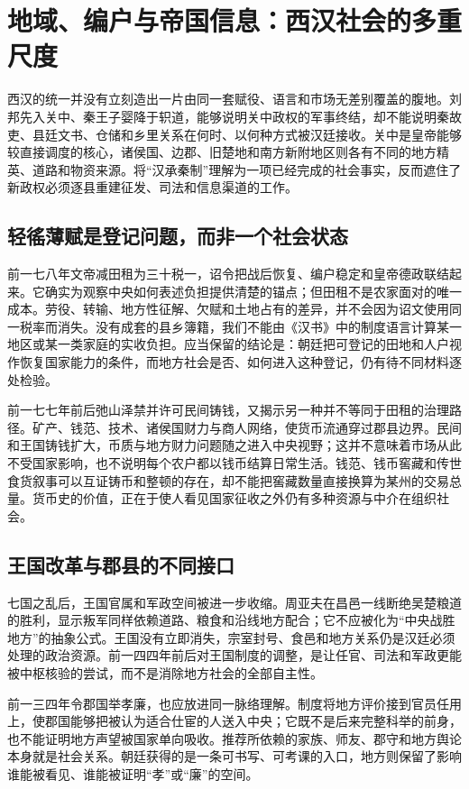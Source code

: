 \section{地域、编户与帝国信息：西汉社会的多重尺度}
\label{sec:western-han-regions-households-information}

西汉的统一并没有立刻造出一片由同一套赋役、语言和市场无差别覆盖的腹地。刘邦先入关中、秦王子婴降于轵道，能够说明关中政权的军事终结，却不能说明秦故吏、县廷文书、仓储和乡里关系在何时、以何种方式被汉廷接收。关中是皇帝能够较直接调度的核心，诸侯国、边郡、旧楚地和南方新附地区则各有不同的地方精英、道路和物资来源。将“汉承秦制”理解为一项已经完成的社会事实，反而遮住了新政权必须逐县重建征发、司法和信息渠道的工作。

\subsection{轻徭薄赋是登记问题，而非一个社会状态}

前一七八年文帝减田租为三十税一，诏令把战后恢复、编户稳定和皇帝德政联结起来。它确实为观察中央如何表述负担提供清楚的锚点；但田租不是农家面对的唯一成本。劳役、转输、地方性征解、欠赋和土地占有的差异，并不会因为诏文使用同一税率而消失。没有成套的县乡簿籍，我们不能由《汉书》中的制度语言计算某一地区或某一类家庭的实收负担。应当保留的结论是：朝廷把可登记的田地和人户视作恢复国家能力的条件，而地方社会是否、如何进入这种登记，仍有待不同材料逐处检验。

前一七七年前后弛山泽禁并许可民间铸钱，又揭示另一种并不等同于田租的治理路径。矿产、钱范、技术、诸侯国财力与商人网络，使货币流通穿过郡县边界。民间和王国铸钱扩大，币质与地方财力问题随之进入中央视野；这并不意味着市场从此不受国家影响，也不说明每个农户都以钱币结算日常生活。钱范、钱币窖藏和传世食货叙事可以互证铸币和整顿的存在，却不能把窖藏数量直接换算为某州的交易总量。货币史的价值，正在于使人看见国家征收之外仍有多种资源与中介在组织社会。

\subsection{王国改革与郡县的不同接口}

七国之乱后，王国官属和军政空间被进一步收缩。周亚夫在昌邑一线断绝吴楚粮道的胜利，显示叛军同样依赖道路、粮食和沿线地方配合；它不应被化为“中央战胜地方”的抽象公式。王国没有立即消失，宗室封号、食邑和地方关系仍是汉廷必须处理的政治资源。前一四四年前后对王国制度的调整，是让任官、司法和军政更能被中枢核验的尝试，而不是消除地方社会的全部自主性。

前一三四年令郡国举孝廉，也应放进同一脉络理解。制度将地方评价接到官员任用上，使郡国能够把被认为适合仕宦的人送入中央；它既不是后来完整科举的前身，也不能证明地方声望被国家单向吸收。推荐所依赖的家族、师友、郡守和地方舆论本身就是社会关系。朝廷获得的是一条可书写、可考课的入口，地方则保留了影响谁能被看见、谁能被证明“孝”或“廉”的空间。

